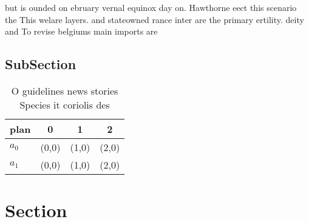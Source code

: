\documentclass[a4paper]{article}
\begin{document}
but is ounded on ebruary vernal equinox day on. Hawthorne eect this scenario the This welare layers. and stateowned rance inter are the primary ertility. deity and To revise belgiums main imports are

\subsection{SubSection}

\begin{table}
\begin{adjustbox}{width=0.5\columnwidth}
\begin{tabular}{|l|l|l|l|}
\hline
\textbf{plan} & \multicolumn{1}{c|}{\textbf{0}} & \multicolumn{1}{c|}{\textbf{1}} & \multicolumn{1}{c|}{\textbf{2}} \\ \hline
\textbf{$a_0$}  & (0,0) & (1,0) & (2,0) \\ \hline
\textbf{$a_1$}  & (0,0) & (1,0) & (2,0) \\ \hline
\end{tabular}
\end{adjustbox}
\caption{O guidelines news stories Species it coriolis des
}
\end{table}

\section{Section}
\end{document}
